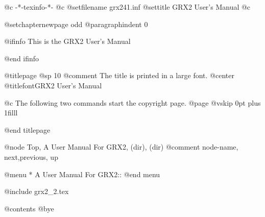    @c -*-texinfo-*-
@c %
@setfilename grx241.inf
@settitle GRX2 User's Manual
@c %

@setchapternewpage odd
@paragraphindent 0

@ifinfo
This is the GRX2 User's Manual

@end ifinfo

@titlepage
@sp 10
@comment The title is printed in a large font.
@center @titlefont{GRX2 User's Manual}

@c The following two commands start the copyright page.
@page
@vskip 0pt plus 1filll

@end titlepage


@node  Top, A User Manual For GRX2, (dir), (dir)
@comment node-name, next,previous, up

@menu
* A User Manual For GRX2::
@end menu

@include grx2_2.tex

@contents
@bye

